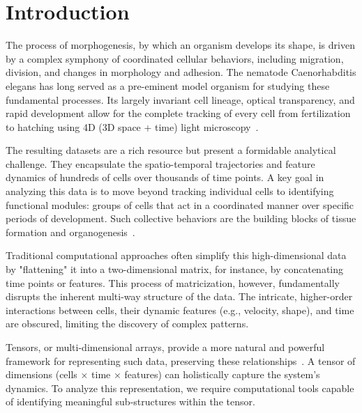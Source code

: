 \documentclass[unnumsec,webpdf,modern,large,namedate]{oup-authoring-template}%
\theoremstyle{thmstyleone}\newtheorem{theorem}{Theorem}
\theoremstyle{thmstyletwo}\newtheorem{example}{Example}
\theoremstyle{thmstylethree}\newtheorem{definition}{Definition}
\begin{document}

\maketitle

\section{Introduction}

The process of morphogenesis, by which an organism develops its shape, is driven by a complex symphony of coordinated cellular behaviors, including migration, division, and changes in morphology and adhesion. The nematode Caenorhabditis elegans has long served as a pre-eminent model organism for studying these fundamental processes. Its largely invariant cell lineage, optical transparency, and rapid development allow for the complete tracking of every cell from fertilization to hatching using 4D (3D space + time) light microscopy~\citep{kaletta2006FindingFunctionNovel,hwang2003CaenorhabditisElegansEarly}.

The resulting datasets are a rich resource but present a formidable analytical challenge. They encapsulate the spatio-temporal trajectories and feature dynamics of hundreds of cells over thousands of time points. A key goal in analyzing this data is to move beyond tracking individual cells to identifying functional modules: groups of cells that act in a coordinated manner over specific periods of development. Such collective behaviors are the building blocks of tissue formation and organogenesis~\citep{setty2008FourdimensionalRealisticModeling}.

Traditional computational approaches often simplify this high-dimensional data by "flattening" it into a two-dimensional matrix, for instance, by concatenating time points or features. This process of matricization, however, fundamentally disrupts the inherent multi-way structure of the data. The intricate, higher-order interactions between cells, their dynamic features (e.g., velocity, shape), and time are obscured, limiting the discovery of complex patterns.

Tensors, or multi-dimensional arrays, provide a more natural and powerful framework for representing such data, preserving these relationships~\citep{sun2008IncrementalTensorAnalysis}. A tensor of dimensions (cells × time × features) can holistically capture the system's dynamics. To analyze this representation, we require computational tools capable of identifying meaningful sub-structures within the tensor.
\end{document}
